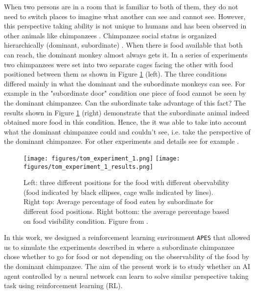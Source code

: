 \documentclass{article}
\begin{document}
\par When two persons are in a room that is familiar to both of them, they do not need to switch places to imagine what another can see and cannot see. However, this perspective taking ability is not unique to humans and has been observed in other animals like chimpanzees \cite{hare2000chimpanzees}. Chimpanzee social status is organized hierarchically (dominant, subordinate) \cite{goldberg1997genetic}. When there is food available that both can reach, the dominant monkey almost always gets it. In a series of experiments \cite{hare2000chimpanzees}  two chimpanzees were set into two separate cages facing the other with food positioned between them as shown in Figure \ref{tom.experiment} (left). The three conditions differed mainly in what the dominant and the subordinate monkeys can see. For example in the "subordinate door" condition one piece of food cannot be seen by the dominant chimpanzee. Can the subordinate take advantage of this fact? The results shown in Figure \ref{tom.experiment} (right) demonstrate that the subordinate animal indeed obtained more food in this condition. Hence, the it was able to take into account what the dominant chimpanzee could and couldn't see, i.e. take the perspective of the dominant chimpanzee. For other experiments and details see for example \cite{hare2000chimpanzees, de2016we, tomasello2009cultural}.  

\begin{figure}[!ht]
\begin{center}
\texttt{[image: figures/tom\_experiment\_1.png]}
\texttt{[image: figures/tom\_experiment\_1\_results.png]}
\caption{Left: three different positions for the food with different obervability (food indicated by black ellipses, cage walls indicated by lines). Right top: Average percentage of food eaten by subordinate for different food positions. Right bottom: the average percentage based on food visibility condition. Figure from \cite{hare2000chimpanzees}.}
\label{tom.experiment}
\end{center}
\end{figure}

In this work, we designed a reinforcement learning environment \texttt{APES} that allowed us to simulate the experiments described in \cite{hare2000chimpanzees} where a subordinate chimpanzee chose whether to go for food or not depending on the observability of the food by the dominant chimpanzee. The aim of the present work is to study whether an AI agent controlled by a neural network can learn to solve similar perspective taking task using reinforcement learning (RL).
\end{document}
